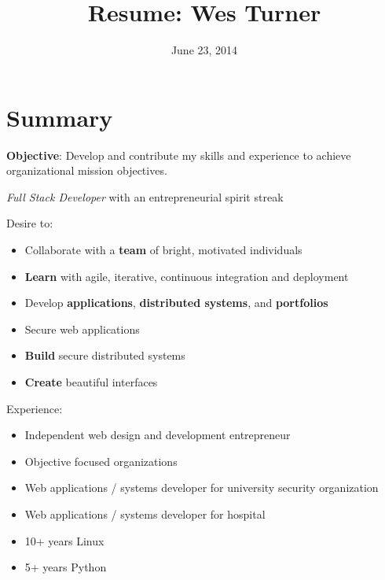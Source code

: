 \documentclass[letter,,openany,oneside]{sphinxhowto}
\title{Resume: Wes Turner}
\date{June 23, 2014}
\author{}
\begin{document}
\maketitle
\tableofcontents
{}\label{resume::doc}

\newpage

\section{Summary}
\label{resume:summary}\label{resume:id1}
\textbf{Objective}: Develop and contribute my skills and experience to
achieve organizational mission objectives.

\emph{Full Stack Developer} with an entrepreneurial spirit streak

Desire to:
\begin{itemize}
\item {} 
Collaborate with a \textbf{team} of bright, motivated individuals

\item {} 
\textbf{Learn} with agile, iterative, continuous integration and deployment

\item {} 
Develop \textbf{applications}, \textbf{distributed systems}, and \textbf{portfolios}

\item {} 
Secure web applications

\item {} 
\textbf{Build} secure distributed systems

\item {} 
\textbf{Create} beautiful interfaces

\end{itemize}

Experience:
\begin{itemize}
\item {} 
Independent web design and development entrepreneur

\item {} 
Objective focused organizations

\item {} 
Web applications / systems developer for university security organization

\item {} 
Web applications / systems developer for hospital

\item {} 
10+ years Linux

\item {} 
5+ years Python

\end{itemize}
\end{document}
